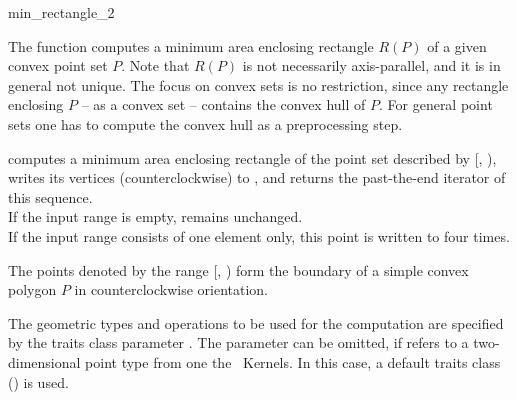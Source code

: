 
\cgalColumnLayout

\begin{ccRefFunction}{min_rectangle_2}
  
  \ccDefinition The function computes a minimum area enclosing rectangle
  $R(P)$ of a given convex point set $P$. Note that $R(P)$ is not
  necessarily axis-parallel, and it is in general not unique. The focus
  on convex sets is no restriction, since any rectangle enclosing $P$
  -- as a convex set -- contains the convex hull of $P$. For general
  point sets one has to compute the convex hull as a preprocessing step.
  

  \def\ccLongParamLayout{\ccTrue} 
  
  
  computes a minimum area enclosing rectangle of the point set described
  by [, ), writes its vertices
  (counterclockwise) to , and returns the past-the-end iterator
  of this sequence.\\
  If the input range is empty,  remains unchanged.\\
  If the input range consists of one element only, this point is written
  to  four times.
  
  \ccPrecond The points denoted by the range [,
  ) form the boundary of a simple convex polygon $P$
  in counterclockwise orientation.
  
  The geometric types and operations to be used for the computation are
  specified by the traits class parameter . The parameter can be
  omitted, if  refers to a two-dimensional point
  type from one the \cgal\ Kernels. In this case, a default traits class
  () is used.
  

\end{ccRefFunction}
